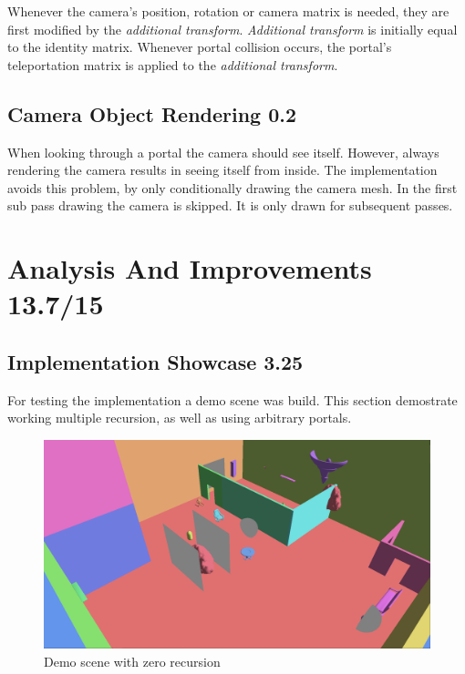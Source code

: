 Whenever the camera's position, rotation or camera matrix is needed, they are first modified by the \textit{additional transform}. \textit{Additional transform} is initially equal to the identity matrix. Whenever portal collision occurs, the portal's teleportation matrix is applied to the \textit{additional transform}.



\subsection{Camera Object Rendering 0.2}
When looking through a portal the camera should see itself. However, always rendering the camera results in seeing itself from inside. The implementation avoids this problem, by only conditionally drawing the camera mesh. In the first sub pass drawing the camera is skipped. It is only drawn for subsequent passes.




\section{Analysis And Improvements 13.7/15}

\subsection{Implementation Showcase 3.25}

For testing the implementation a demo scene was build. This section demostrate working multiple recursion, as well as using arbitrary portals.

\begin{figure}[H]
	\centering
	\includegraphics[width=\linewidth]{images/portals.png}
	\caption{Demo scene with zero recursion}
	\label{fig:demodisabled}
\end{figure}


